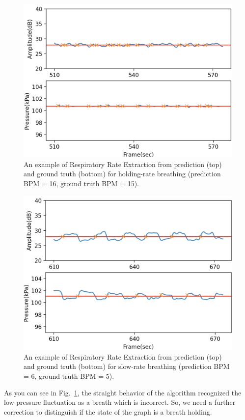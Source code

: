 \documentclass[10pt,letterpaper]{article}
\begin{document}
\begin{figure}[htbp]
	\centerline{\includegraphics[width=120mm,scale=0.9]{PD2GT_HOLD02.png}}
	\caption{An example of Respiratory Rate Extraction from prediction (top) and ground truth (bottom) for holding-rate breathing (prediction BPM = 16, ground truth BPM = 15).}
	\label{fig:RREXT_HOLD}
\end{figure}
\begin{figure}[htbp]
	\centerline{\includegraphics[width=120mm,scale=0.9]{PD2GT_SLOW02.png}}
	\caption{An example of Respiratory Rate Extraction from prediction (top) and ground truth (bottom) for slow-rate breathing (prediction BPM = 6, ground truth BPM = 5).}
	\label{fig:RREXT_SLOW}
\end{figure}

As you can see in Fig.~\ref{fig:RREXT_HOLD}, the straight behavior of the algorithm recognized the low pressure fluctuation as a breath which is incorrect. So, we need a further correction to distinguish if the state of the graph is a breath holding.
	
\end{document}
